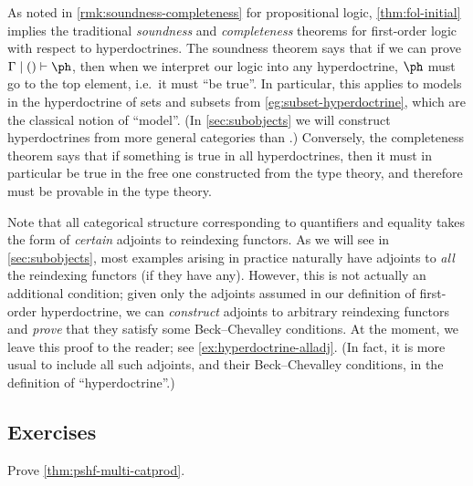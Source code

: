 \begin{rmk}\label{rmk:fol-soundness-completeness}
  As noted in \cref{rmk:soundness-completeness} for propositional logic, \cref{thm:fol-initial} implies the traditional \emph{soundness} and \emph{completeness} theorems for first-order logic with respect to hyperdoctrines.
  The soundness theorem says that if we can prove $\Gamma\cb \ec\types \ph$, then when we interpret our logic into any hyperdoctrine, $\ph$ must go to the top element, i.e.\ it must ``be true''.
  In particular, this applies to models in the hyperdoctrine of sets and subsets from \cref{eg:subset-hyperdoctrine}, which are the classical notion of ``model''.
  (In \cref{sec:subobjects} we will construct hyperdoctrines from more general categories than \bSet.)
  Conversely, the completeness theorem says that if something is true in all hyperdoctrines, then it must in particular be true in the free one constructed from the type theory, and therefore must be provable in the type theory.
\end{rmk}

\begin{rmk}
  Note that all categorical structure corresponding to quantifiers and equality takes the form of \emph{certain} adjoints to reindexing functors.
  As we will see in \cref{sec:subobjects}, most examples arising in practice naturally have adjoints to \emph{all} the reindexing functors (if they have any).
  However, this is not actually an additional condition; given only the adjoints assumed in our definition of first-order hyperdoctrine, we can \emph{construct} adjoints to arbitrary reindexing functors and \emph{prove} that they satisfy some Beck--Chevalley conditions.
  At the moment, we leave this proof to the reader; see \cref{ex:hyperdoctrine-alladj}.
  (In fact, it is more usual to include all such adjoints, and their Beck--Chevalley conditions, in the definition of ``hyperdoctrine''.)
\end{rmk}


\subsection*{Exercises}

\begin{ex}\label{ex:pshf-multi-catprod}
  Prove \cref{thm:pshf-multi-catprod}.
\end{ex}

